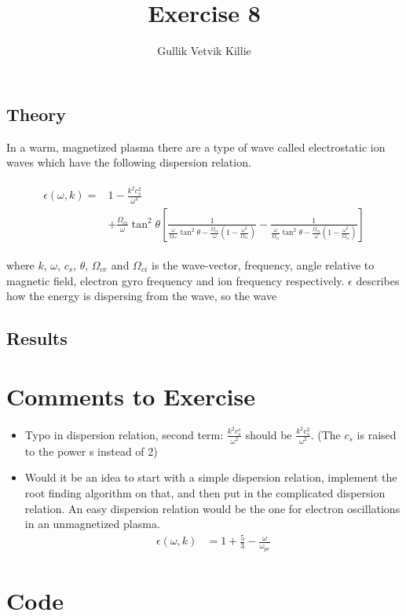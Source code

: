 \documentclass[x11names]{article}
\title{ Exercise 8}
\author{Gullik Vetvik Killie
		}
\begin{document}
\maketitle

\section{}

\subsection{Theory}
  In a warm, magnetized plasma there are a type of wave called electrostatic ion waves which have the following dispersion relation.

  \begin{align}
    \begin{split}
      \epsilon(\omega,k) = &1- \frac{k^2c_s^2}{\omega^2} 
      \\
      & + \frac{\Omega_{ci}}{\omega}\tan^2\theta \left[  \frac{1}{ \frac{\omega}{\Omega_{ce}}\tan^2 \theta - \frac{\Omega_{ce}}{\omega} \left( 1 - \frac{\omega^2}{\Omega_{ce}} \right) }  
                                                        -\frac{1}{ \frac{\omega}{\Omega_{ci}}\tan^2 \theta - \frac{\Omega_{ci}}{\omega} \left( 1 - \frac{\omega^2}{\Omega_{ci}} \right) } \right]
    \end{split}
  \end{align}

  where \(k\), \(\omega\), \(c_s\), \(\theta\), \(\Omega_{ce}\) and \(\Omega_{ci}\) is the wave-vector, frequency, angle relative to magnetic field, electron gyro frequency and ion frequency respectively. \(\epsilon\) describes how the energy is dispersing from the wave, so the wave 


\subsection{Results}
  


\appendix
\section{Comments to Exercise}
  
  \begin{itemize}
    \item Typo in dispersion relation, second term: \(\frac{k^2c_s^s}{\omega^2}\) should be \(\frac{k^2c_s^2}{\omega^2}\). (The \(c_s\) is raised to the power s instead of 2)
    \item Would it be an idea to start with a simple dispersion relation, implement the root finding algorithm on that, and then put in the complicated dispersion relation. An easy dispersion relation would be the one for electron oscillations in an unmagnetized plasma.
    \begin{align}
      \epsilon(\omega, k) &= 1 + \frac{5}{3} - \frac{\omega}{\omega_{pe}}
    \end{align}
  \end{itemize}



\section{Code}
  \label{sec:code}
  
\end{document}
